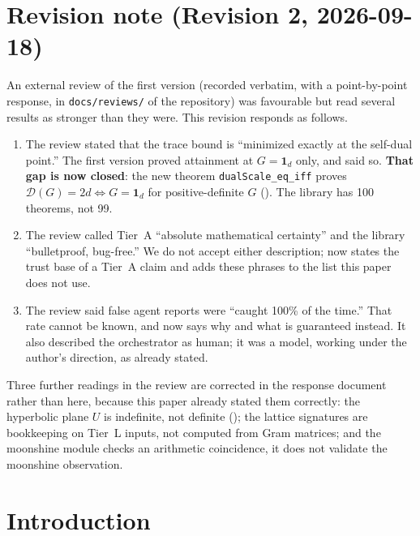 \documentclass[11pt,a4paper]{article}
\theoremstyle{remark}
\begin{document}
\section*{Revision note (Revision 2, 2026-09-18)}
An external review of the first version (recorded verbatim, with a point-by-point response, in
\texttt{docs/reviews/} of the repository) was favourable but read several results as stronger than
they were. This revision responds as follows.
\begin{enumerate}
  \item The review stated that the trace bound is ``minimized exactly at the self-dual point.'' The
    first version proved attainment at $G=\mathbf 1_d$ only, and said so. \textbf{That gap is now
    closed}: the new theorem \texttt{dualScale\_eq\_iff} proves
    $\mathcal{D}(G)=2d\iff G=\mathbf 1_d$ for positive-definite $G$ (). The
    library has 100 theorems, not 99.
  \item The review called Tier~A ``absolute mathematical certainty'' and the library ``bulletproof,
    bug-free.'' We do not accept either description;  now states the trust base of
    a Tier~A claim and adds these phrases to the list this paper does not use.
  \item The review said false agent reports were ``caught 100\% of the time.'' That rate cannot be
    known, and  now says why and what is guaranteed instead. It also described the
    orchestrator as human; it was a model, working under the author's direction, as
     already stated.
\end{enumerate}
Three further readings in the review are corrected in the response document rather than here,
because this paper already stated them correctly: the hyperbolic plane $U$ is indefinite, not
definite (); the lattice signatures are bookkeeping on Tier~L inputs, not computed
from Gram matrices; and the moonshine module checks an arithmetic coincidence, it does not validate
the moonshine observation.

\section{Introduction}
\label{sec:intro}
\end{document}
